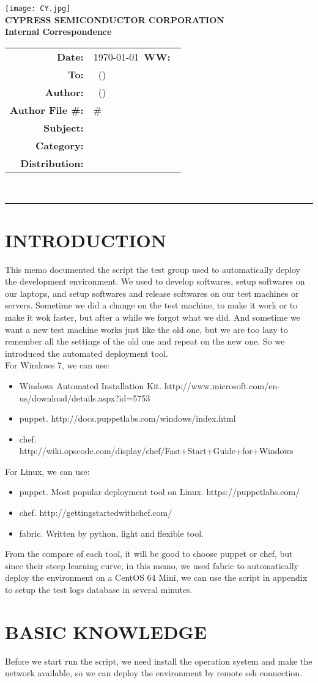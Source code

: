 \documentclass{article}
\renewcommand{\maketitle}
{
    \begin{center}
    \texttt{[image: CY.jpg]}\\
    \vspace{5 mm}
    \large
    {
    \textbf{CYPRESS SEMICONDUCTOR CORPORATION}\\
    \textbf{Internal Correspondence}\\
    }
    \vspace{1 mm}
    \hspace{0.5 in}
    \begin{tabular}{rl}
    \bf Date: & \today\ \hspace{2 in}\textbf{WW:\ }\WorkWeek\\
    \bf To: & \BossName\ (\BossInitials)\\
    \bf Author: & \Author\ (\AuthorInitials)\\
    \bf Author File \#: & \AuthorInitials\#\MemoNumber\\
    \bf Subject: & \Subject\\
    \bf Category: & \Category\\
    \bf Distribution: & \Distribution\\
    \end{tabular}
    \vspace{3 mm}\\
    \hrule
    \end{center}
    
    \thispagestyle{firstpage}
    \pagestyle{normalpage}
}
\begin{document}
\maketitle

\section{INTRODUCTION}
This memo documented the script the test group used to automatically deploy the development environment.
We used to develop softwares, setup softwares on our laptops, and setup softwares and release softwares on our test machines or servers.
Sometime we did a change on the test machine, to make it work or to make it wok faster, but after a while we forgot what we did. 
And sometime we want a new test machine works just like the old one, but we are too lazy to remember all the settings of the old one and repeat on the new one.
So we introduced the automated deployment tool.\\
For Windows 7, we can use:
\begin{itemize}
    \item
    Windows Automated Installation Kit.    
    http://www.microsoft.com/en-us/download/details.aspx?id=5753
    \item
    puppet. 
    http://docs.puppetlabs.com/windows/index.html 
    \item
    chef.
    http://wiki.opscode.com/display/chef/Fast+Start+Guide+for+Windows
\end{itemize}
For Linux, we can use:
\begin{itemize}
    \item
    puppet. Most popular deployment tool on Linux. 
    https://puppetlabs.com/
    \item
    chef. 
    http://gettingstartedwithchef.com/ 
    \item
    fabric. Written by python, light and flexible tool.
\end{itemize}
From the compare of each tool, it will be good to choose puppet or chef, but since their steep learning curve,
in this memo, we used fabric to automatically deploy the environment on a CentOS 64 Mini, we can use the script in appendix to setup the test logs database in several minutes.

\section{BASIC KNOWLEDGE}
Before we start run the script, we need install the operation system and make the network available, so we can deploy the environment by remote ssh connection.
\end{document}
